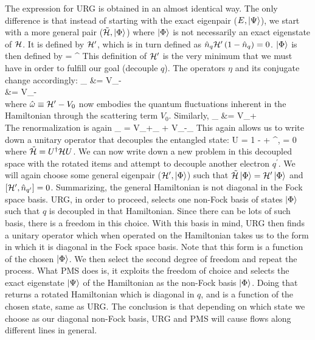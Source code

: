 \documentclass[12pt,twoside]{article}
\numberwithin{equation}{section}
\begin{document}
\pb The expression for URG is obtained in an almost identical way. The only difference is that instead of starting with the exact eigenpair (\(E,\ket{\Psi}\)), we start with a more general pair (\(\tilde {\mathcal{H}}, \ket{\Phi}\)) where \(\ket{\Phi}\) is not necessarily an exact eigenstate of \(\mathcal{H}\). It is defined by \(\mathcal{H}^\prime\), which is in turn defined as \(\hat n_q \mathcal{H}^\prime\left({1 - \hat n_q}\right) = 0\). \(\ket{\Phi}\) is then defined by
\beq
\ham\ket{\Phi} = \ham^\prime \ket{\Phi}
\eeq
This definition of \(\mathcal{H}^\prime\) is the very minimum that we must have in order to fulfill our goal (decouple \(q\)). 
\pb The operators \(\eta\) and its conjugate change accordingly:
\beq
\rr{\eta}_ &= V_-\\
     &= V_-\\
\eeq
where \(\hat \omega \equiv \mathcal{H}^\prime - V_0\) now embodies the quantum fluctuations inherent in the Hamiltonian through the scattering term \(V_0\). Similarly,
\beq
\rr{\eta^\dagger}_ &= V_+\\
\eeq
The renormalization is again
\beq
\rr{\Delta \ham}_ = V_+\rr{\eta}_ + V_-\rr{\eta^\dagger}_
\eeq
This again allows us to write down a unitary operator that decouples the entangled state:
\beq
U =  1 - \eta + \eta^\dagger,  = 0
\eeq
where \(\tilde {\mathcal{H}} = U^\dagger \mathcal{H} U\). We can now write down a new problem in this decoupled space with the rotated items and attempt to decouple another electron \(q^\prime\). We will again choose some general eigenpair (\(\mathcal{H}^\prime,\ket{\Phi}\)) such that \(\tilde{\mathcal{H}}\ket{\Phi} = \mathcal{H}^{\prime}\ket{\Phi}\) and \(\left[{\mathcal{H}^{\prime},\hat n_{q^\prime}}\right]=0\).
\pb Summarizing, the general Hamiltonian is not diagonal in the Fock space basis.
URG, in order to proceed, selects one non-Fock basis of states \(\ket{\Phi}\) such that \(q\) is decoupled in that Hamiltonian.
Since there can be lots of such basis, there is a freedom in this choice.
With this basis in mind, URG then finds a unitary operator which when operated on the Hamiltonian takes us to the form in which it is diagonal in the Fock space basis.
Note that this form is a function of the chosen \(\ket{\Phi}\).
We then select the second degree of freedom and repeat the process.
What PMS does is, it exploits the freedom of choice and selects the exact eigenstate \(\ket{\Psi}\) of the Hamiltonian as the non-Fock basis \(\ket{\Phi}\).
Doing that returns a rotated Hamiltonian which is diagonal in \(q\), and is a function of the chosen state, same as URG. The conclusion is that depending on which state we choose as our diagonal non-Fock basis, URG and PMS will cause flows along different lines in general.
\end{document}

